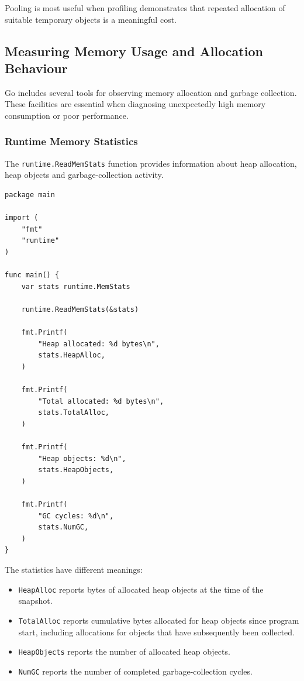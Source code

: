 Pooling is most useful when profiling demonstrates that repeated allocation of suitable temporary objects is a meaningful cost.\\

\subsection{Measuring Memory Usage and Allocation Behaviour}

Go includes several tools for observing memory allocation and garbage collection. These facilities are essential when diagnosing unexpectedly high memory consumption or poor performance.\\

\subsubsection{Runtime Memory Statistics}

The \texttt{runtime.ReadMemStats} function provides information about heap allocation, heap objects and garbage-collection activity.\\

\begin{lstlisting}
package main

import (
    "fmt"
    "runtime"
)

func main() {
    var stats runtime.MemStats

    runtime.ReadMemStats(&stats)

    fmt.Printf(
        "Heap allocated: %d bytes\n",
        stats.HeapAlloc,
    )

    fmt.Printf(
        "Total allocated: %d bytes\n",
        stats.TotalAlloc,
    )

    fmt.Printf(
        "Heap objects: %d\n",
        stats.HeapObjects,
    )

    fmt.Printf(
        "GC cycles: %d\n",
        stats.NumGC,
    )
}
\end{lstlisting}

The statistics have different meanings:

\begin{itemize}
    \item \texttt{HeapAlloc} reports bytes of allocated heap objects at the time of the snapshot.
    \item \texttt{TotalAlloc} reports cumulative bytes allocated for heap objects since program start, including allocations for objects that have subsequently been collected.
    \item \texttt{HeapObjects} reports the number of allocated heap objects.
    \item \texttt{NumGC} reports the number of completed garbage-collection cycles.
\end{itemize}

